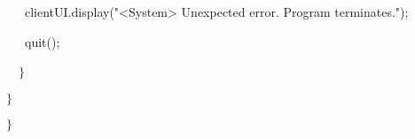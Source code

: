 {{\hlstd }{\hlstd\ \ \ }{\hlstd clientUI}{\hlsym .}{\hlstd }{\hlkwd display}{\hlstd }{\hlsym (}{\hlstd }{\hlstr "$\mathord{<}$System$\mathord{>}$ Unexpected error. Program terminates."}{\hlstd }{\hlsym );}\leavevmode\par
{\hlstd }{\hlstd\ \ \ }{\hlstd }{\hlkwd quit}{\hlstd }{\hlsym ();}\leavevmode\par
{\hlstd }{\hlstd\ \ }{\hlstd }{\hlsym $\}$}\leavevmode\par
{\hlstd 	}{\hlsym $\}$}\leavevmode\par
{\hlstd }{\hlsym $\}$}{\hlstd }\leavevmode\par
}
\bye
